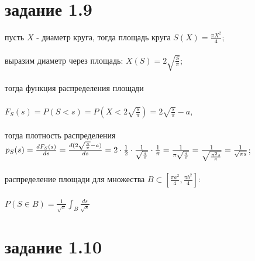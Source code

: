 \documentclass[a4paper]{article}
\begin{document}
\begin{large}
	\section*{задание 1.9}
	пусть $X$ - диаметр круга, тогда площадь круга $S(X)=\frac{\pi X^2}{4}$;\\\\
	выразим диаметр через площадь: $X(S)=2\sqrt{\frac{S}{\pi}}$;\\\\
	тогда функция распределения площади\\\\ $F_S(s)=P(S<s)=P(X<2\sqrt{\frac{s}{\pi}})=2\sqrt{\frac{s}{\pi}}-a$,\\\\
	тогда плотность распределения $p_S(s)=\frac{dF_S(s)}{ds}=\frac{d(2\sqrt{\frac{s}{\pi}}-a)}{ds}=\\\\2\cdot \frac{1}{2}\cdot \frac{1}{\sqrt{\frac{s}{\pi}}}\cdot \frac{1}{\pi}=\frac{1}{\pi\sqrt{\frac{s}{\pi}}}=\frac{1}{\sqrt{\frac{\pi^2s}{\pi}}}=\frac{1}{\sqrt{\pi s}}$;\\\\
	распределение площади для множества $B\subset[\frac{\pi a^2}{4},\frac{\pi b^2}{4}]$:\\\\
	$P(S\in B)=\frac{1}{\sqrt{\pi}}\int_B \frac{ds}{\sqrt{s}}$
	\section*{задание 1.10}
	
	\end{large}
\end{document}
